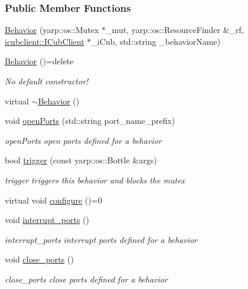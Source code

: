 \subsubsection*{Public Member Functions}
\begin{DoxyCompactItemize}
\item 
\hyperlink{group__behaviorManager_acd73bfebbe60da8cb7ef41cbde780bec}{Behavior} (yarp\+::os\+::\+Mutex $\ast$\+\_\+mut, yarp\+::os\+::\+Resource\+Finder \&\+\_\+rf, \hyperlink{group__icubclient__clients_classicubclient_1_1ICubClient}{icubclient\+::\+I\+Cub\+Client} $\ast$\+\_\+i\+Cub, std\+::string \+\_\+behavior\+Name)
\item 
\hyperlink{group__behaviorManager_aab6b9945e55735c64af699fef74b23cf}{Behavior} ()=delete
\begin{DoxyCompactList}\small\item\em No default constructor! \end{DoxyCompactList}\item 
virtual \hyperlink{group__behaviorManager_aff31e5c76f8837460f90403381a4a94e}{$\sim$\+Behavior} ()
\item 
void \hyperlink{group__behaviorManager_ae3f73b56e5c85cea1e6666c90ef6199c}{open\+Ports} (std\+::string port\+\_\+name\+\_\+prefix)
\begin{DoxyCompactList}\small\item\em open\+Ports open ports defined for a behavior \end{DoxyCompactList}\item 
bool \hyperlink{group__behaviorManager_ab335b84ae07048c012ed4baaeea4a5fd}{trigger} (const yarp\+::os\+::\+Bottle \&args)
\begin{DoxyCompactList}\small\item\em trigger triggers this behavior and blocks the mutex \end{DoxyCompactList}\item 
virtual void \hyperlink{group__behaviorManager_a30484d4d6de3c0689de4f60da3efbab8}{configure} ()=0
\item 
void \hyperlink{group__behaviorManager_af22cc728f8096912bb394db4b105bf05}{interrupt\+\_\+ports} ()
\begin{DoxyCompactList}\small\item\em interrupt\+\_\+ports interrupt ports defined for a behavior \end{DoxyCompactList}\item 
void \hyperlink{group__behaviorManager_adf37f264e178c929b5935f546d268f34}{close\+\_\+ports} ()
\begin{DoxyCompactList}\small\item\em close\+\_\+ports close ports defined for a behavior \end{DoxyCompactList}\end{DoxyCompactItemize}
